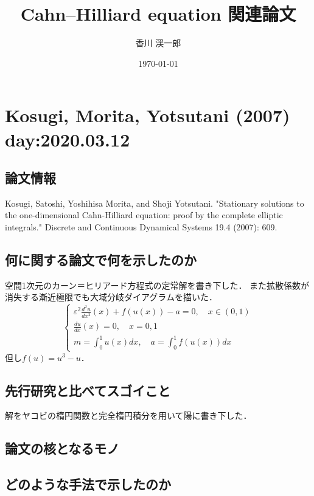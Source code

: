 \documentclass[openary, a4paper, oneside]{jsarticle}
\author{香川 渓一郎}
\date{\today}
\title{Cahn--Hilliard equation 関連論文}
\begin{document}
\maketitle
\tableofcontents

\newpage

\section{Kosugi, Morita, Yotsutani (2007) day:2020.03.12}
	\subsection{論文情報}
		Kosugi, Satoshi, Yoshihisa Morita, and Shoji Yotsutani. "Stationary solutions to the one-dimensional Cahn-Hilliard equation: proof by the complete elliptic integrals." Discrete and Continuous Dynamical Systems 19.4 (2007): 609.

	\subsection{何に関する論文で何を示したのか}
		空間1次元のカーン＝ヒリアード方程式の定常解を書き下した．
		また拡散係数が消失する漸近極限でも大域分岐ダイアグラムを描いた．
		\begin{equation}\left\{\begin{array}{ll}
			\varepsilon^{2} \frac{d^{2} u}{d x^{2}}(x)+f(u(x))-a=0,\quad x \in(0,1) \\
			\frac{d u}{d x}(x)=0,\quad x=0,1 \\
			m=\int_{0}^{1} u(x) d x,\quad a=\int_{0}^{1} f(u(x)) d x
		\end{array} \right.\end{equation}
		但し$f(u) = u^3 - u$．

	\subsection{先行研究と比べてスゴイこと}
		解をヤコビの楕円関数と完全楕円積分を用いて陽に書き下した．

	\subsection{論文の核となるモノ}

	\subsection{どのような手法で示したのか}
\end{document}
